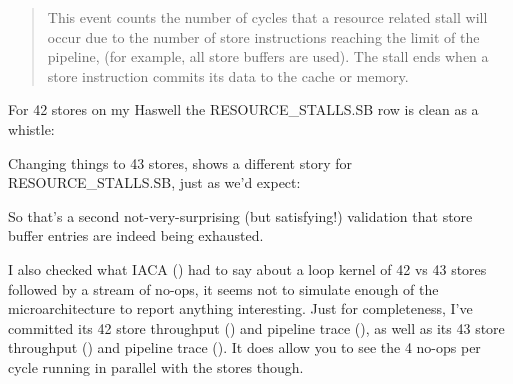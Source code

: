 \documentclass[11pt]{article}
\begin{document}
\begin{quote}
This event counts the number of cycles that a resource related stall will occur due to the number of store instructions reaching the limit of the pipeline, (for example, all store buffers are used). The stall ends when a store instruction commits its data to the cache or memory.
\end{quote}

For 42 stores on my Haswell the RESOURCE\_STALLS.SB row is clean as a whistle:

\begin{center}\end{center}

Changing things to 43 stores, shows a different story for RESOURCE\_STALLS.SB, just as we'd expect:

\begin{center}\end{center}

So that's a second not-very-surprising (but satisfying!) validation that store buffer entries are indeed being exhausted.

I also checked what IACA (\texttt{}) had to say about a loop kernel of 42 vs 43 stores followed by a stream of no-ops, it seems not to simulate enough of the microarchitecture to report anything interesting. Just for completeness, I've committed its 42 store throughput (\texttt{}) and pipeline trace (\texttt{}), as well as its 43 store throughput (\texttt{}) and pipeline trace (\texttt{}). It does allow you to see the 4 no-ops per cycle running in parallel with the stores though.
\end{document}
